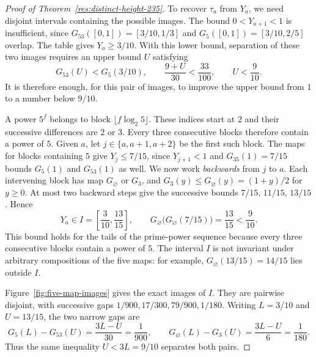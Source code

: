 \documentclass[11pt]{article}
\begin{document}
\begin{proof}[Proof of Theorem~\ref{res:distinct-height-235}]
To recover $\tau_a$ from $Y_a$, we need disjoint intervals containing
the possible images. The bound $0<Y_{a+1}<1$ is insufficient, since
$G_{53}([0,1])=[3/10,1/3]$ and $G_5([0,1])=[3/10,2/5]$ overlap.
The table gives $Y_a\ge3/10$. With this lower bound, separation of
these two images requires an upper bound $U$ satisfying
\[
 G_{53}(U)<G_5(3/10),\qquad
 \frac{9+U}{30}<\frac{33}{100},\qquad U<\frac9{10}.
\]
It is therefore enough, for this pair of images, to improve the upper
bound from $1$ to a number below $9/10$.

A power $5^f$ belongs to block $\lfloor f\log_2 5\rfloor$. These
indices start at $2$ and their successive differences are $2$ or $3$.
Every three consecutive blocks therefore contain a power of $5$.
Given $a$, let $j\in\{a,a+1,a+2\}$ be the first such block. The maps
for blocks containing $5$ give $Y_j\le7/15$, since $Y_{j+1}<1$ and
$G_{35}(1)=7/15$ bounds $G_5(1)$ and $G_{53}(1)$ as well.
We now work \emph{backwards} from $j$ to $a$. Each intervening block
has map $G_\varnothing$ or $G_3$, and
$G_3(y)\le G_\varnothing(y)=(1+y)/2$ for $y\ge0$.
At most two backward steps give the successive bounds
$7/15$, $11/15$, $13/15$. Hence
\begin{equation}\label{eq:five-interval}
 Y_a\in I=\left[\frac3{10},\frac{13}{15}\right],\qquad
 G_\varnothing\bigl(G_\varnothing(7/15)\bigr)=\frac{13}{15}<\frac9{10}.
\end{equation}
This bound holds for the tails of the prime-power sequence because
every three consecutive blocks contain a power of $5$. The interval
$I$ is not invariant under arbitrary compositions of the five maps:
for example, $G_\varnothing(13/15)=14/15$ lies outside $I$.

Figure~\ref{fig:five-map-images} gives the exact images of $I$. They
are pairwise disjoint, with successive gaps
$1/900,17/300,79/900,1/180$. Writing $L=3/10$ and $U=13/15$, the two
narrow gaps are
\[
 G_5(L)-G_{53}(U)=\frac{3L-U}{30}=\frac1{900},\qquad
 G_\varnothing(L)-G_3(U)=\frac{3L-U}{6}=\frac1{180}.
\]
Thus the same inequality $U<3L=9/10$ separates both pairs.


\end{proof}
\end{document}
